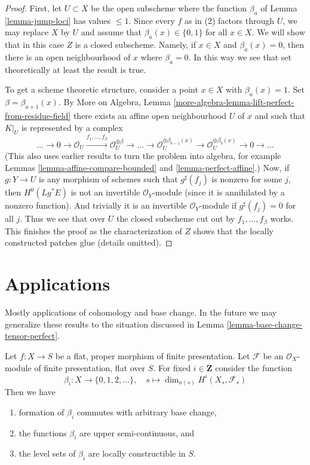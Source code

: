 \begin{proof}
First, let $U \subset X$ be the open subscheme where the function
$\beta_a$ of Lemma \ref{lemma-jump-loci} has values $\leq 1$.
Since every $f$ as in (2) factors through $U$, we may replace
$X$ by $U$ and assume that $\beta_a(x) \in \{0, 1\}$ for all $x \in X$.
We will show that in this case $Z$ is a closed subscheme.
Namely, if $x \in X$ and $\beta_a(x) = 0$, then there is an
open neighbourhood of $x$ where $\beta_a = 0$. In this way we
see that set theoretically at least the result is true.

\medskip\noindent
To get a scheme theoretic structure, consider a point $x \in X$
with $\beta_a(x) = 1$. Set $\beta = \beta_{a + 1}(x)$.
By More on Algebra, Lemma
\ref{more-algebra-lemma-lift-perfect-from-residue-field}
there exists an affine open neighbourhood $U$ of $x$ and
such that $K|_U$ is represented by a complex
$$
\ldots \to 0 \to \mathcal{O}_U
\xrightarrow{f_1, \ldots, f_\beta} \mathcal{O}_U^{\oplus \beta} \to
\ldots \to
\mathcal{O}_U^{\oplus \beta_{b - 1}(x)} \to
\mathcal{O}_U^{\oplus \beta_b(x)} \to 0
\to \ldots
$$
(This also uses earlier results to turn the problem into algebra, for example
Lemmas \ref{lemma-affine-compare-bounded} and
\ref{lemma-perfect-affine}.) Now, if $g : Y \to U$ is any morphism
of schemes such that $g^\sharp(f_j)$ is nonzero for some $j$, then
$H^0(Lg^*E)$ is not an invertible $\mathcal{O}_Y$-module (since it is
annihilated by a nonzero function).
And trivially it is an invertible $\mathcal{O}_Y$-module if
$g^\sharp(f_j) = 0$ for all $j$. Thus we see that over $U$ the
closed subscheme cut out by $f_1, \ldots, f_\beta$ works.
This finishes the proof as the characterization of $Z$ shows
that the locally constructed patches glue (details omitted).
\end{proof}





\section{Applications}
\label{section-applications}

\noindent
Mostly applications of cohomology and base change. In the future we may
generalize these results to the situation discussed in
Lemma \ref{lemma-base-change-tensor-perfect}.

\begin{lemma}
\label{lemma-jump-loci-geometric}
Let $f : X \to S$ be a flat, proper morphism of finite presentation.
Let $\mathcal{F}$ be an $\mathcal{O}_X$-module of finite presentation,
flat over $S$. For fixed $i \in \mathbf{Z}$ consider the function
$$
\beta_i : X \to \{0, 1, 2, \ldots\},\quad
s \longmapsto \dim_{\kappa(s)} H^i(X_s, \mathcal{F}_s)
$$
Then we have
\begin{enumerate}
\item formation of $\beta_i$ commutes with arbitrary base change,
\item the functions $\beta_i$ are upper semi-continuous, and
\item the level sets of $\beta_i$ are locally constructible in $S$.
\end{enumerate}
\end{lemma}

